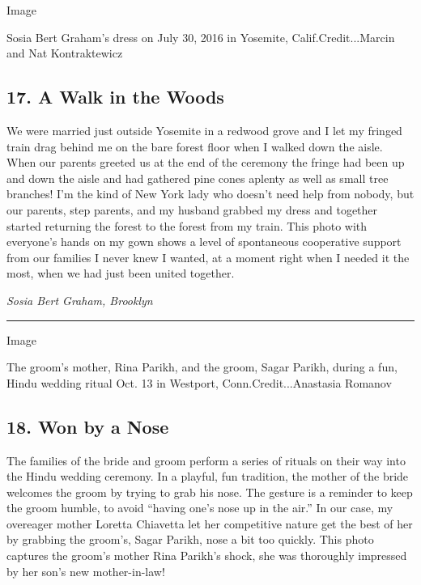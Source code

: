 Image

Sosia Bert Graham's dress on July 30, 2016 in Yosemite,
Calif.Credit...Marcin and Nat Kontraktewicz

\hypertarget{17-a-walk-in-the-woods}{%
\subsection{17. A Walk in the Woods}\label{17-a-walk-in-the-woods}}

We were married just outside Yosemite in a redwood grove and I let my
fringed train drag behind me on the bare forest floor when I walked down
the aisle. When our parents greeted us at the end of the ceremony the
fringe had been up and down the aisle and had gathered pine cones
aplenty as well as small tree branches! I'm the kind of New York lady
who doesn't need help from nobody, but our parents, step parents, and my
husband grabbed my dress and together started returning the forest to
the forest from my train. This photo with everyone's hands on my gown
shows a level of spontaneous cooperative support from our families I
never knew I wanted, at a moment right when I needed it the most, when
we had just been united together.

\emph{Sosia Bert Graham, Brooklyn}

\begin{center}\rule{0.5\linewidth}{\linethickness}\end{center}

Image

The groom's mother, Rina Parikh, and the groom, Sagar Parikh, during a
fun, Hindu wedding ritual Oct. 13 in Westport, Conn.Credit...Anastasia
Romanov

\hypertarget{18-won-by-a-nose}{%
\subsection{18. Won by a Nose}\label{18-won-by-a-nose}}

The families of the bride and groom perform a series of rituals on their
way into the Hindu wedding ceremony. In a playful, fun tradition, the
mother of the bride welcomes the groom by trying to grab his nose. The
gesture is a reminder to keep the groom humble, to avoid ``having one's
nose up in the air.'' In our case, my overeager mother Loretta Chiavetta
let her competitive nature get the best of her by grabbing the groom's,
Sagar Parikh, nose a bit too quickly. This photo captures the groom's
mother Rina Parikh's shock, she was thoroughly impressed by her son's
new mother-in-law!

